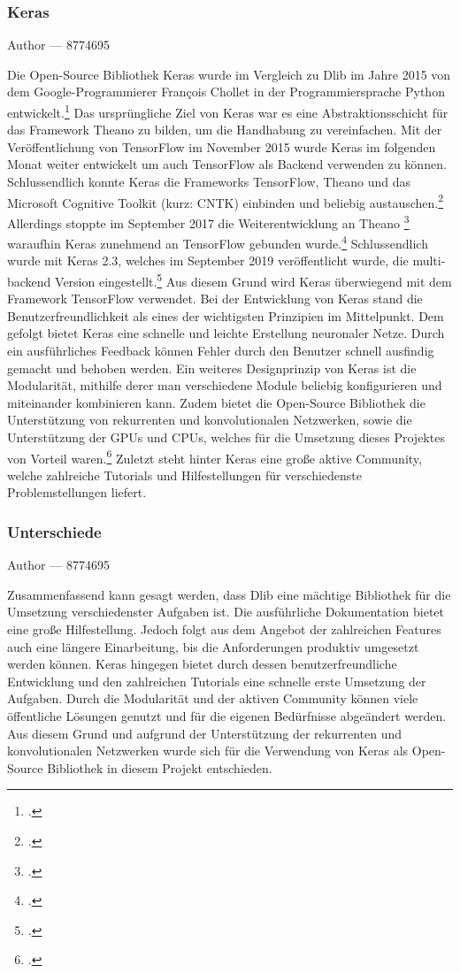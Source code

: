 \documentclass[12pt, a4paper]{report}
\makeatletter
\newcommand{\sectionauthor}[1]{%
  {\parindent0pt\vspace*{-5pt}%
  \large{Author --- }
  \linespread{1.1}\large\scshape#1%
  \par\nobreak\vspace*{35pt} }
  \@afterheading%
}
\makeatother
\begin{document}
\subsubsection{Keras}
\sectionauthor{8774695}
Die Open-Source Bibliothek Keras wurde im Vergleich zu Dlib im Jahre 2015 von dem Google-Programmierer François Chollet in der Programmiersprache Python entwickelt.\footcite[Vgl.]{Keras}
Das ursprüngliche Ziel von Keras war es eine Abstraktionsschicht für das Framework Theano zu bilden, um die Handhabung zu vereinfachen. Mit der Veröffentlichung von TensorFlow im November 2015 wurde Keras im folgenden Monat weiter entwickelt um auch TensorFlow als Backend verwenden zu können. Schlussendlich konnte Keras die Frameworks TensorFlow, Theano und das Microsoft Cognitive Toolkit (kurz: CNTK) einbinden und beliebig austauschen.\footcite[Vgl.]{Keras3} Allerdings stoppte im September 2017 die Weiterentwicklung an Theano
\footcite[Vgl.]{Theano}
 waraufhin Keras zunehmend an TensorFlow gebunden wurde.\footcite[Vgl.]{Keras4} Schlussendlich wurde mit Keras 2.3, welches im September 2019 veröffentlicht wurde, die multi-backend Version eingestellt.\footcite[Vgl.]{Keras5} Aus diesem Grund wird Keras überwiegend mit dem Framework TensorFlow verwendet.
\newline
Bei der Entwicklung von Keras stand die Benutzerfreundlichkeit als eines der wichtigsten Prinzipien im Mittelpunkt. Dem gefolgt bietet Keras eine schnelle und leichte Erstellung neuronaler Netze. Durch ein ausführliches Feedback können Fehler durch den Benutzer schnell ausfindig gemacht und behoben werden. Ein weiteres Designprinzip von Keras ist die Modularität, mithilfe derer man verschiedene Module beliebig konfigurieren und miteinander kombinieren kann. Zudem bietet die Open-Source Bibliothek die Unterstützung von rekurrenten und konvolutionalen Netzwerken, sowie die Unterstützung der GPUs und CPUs, welches für die Umsetzung dieses Projektes von Vorteil waren.\footcite[Vgl.]{Keras2}
Zuletzt steht hinter Keras eine große aktive Community, welche zahlreiche Tutorials und Hilfestellungen für verschiedenste Problemstellungen liefert.


\subsubsection{Unterschiede}
\sectionauthor{8774695}
Zusammenfassend kann gesagt werden, dass Dlib eine mächtige Bibliothek für die Umsetzung verschiedenster Aufgaben ist. Die ausführliche Dokumentation bietet eine große Hilfestellung. Jedoch folgt aus dem Angebot der zahlreichen Features auch eine längere Einarbeitung, bis die Anforderungen produktiv umgesetzt werden können.\newline
Keras hingegen bietet durch dessen benutzerfreundliche Entwicklung und den zahlreichen Tutorials eine schnelle erste Umsetzung der Aufgaben. Durch die Modularität und der aktiven Community können viele öffentliche Lösungen genutzt und für die eigenen Bedürfnisse abgeändert werden. 
Aus diesem Grund und aufgrund der Unterstützung der rekurrenten und konvolutionalen Netzwerken wurde sich für die Verwendung von Keras als Open-Source Bibliothek in diesem Projekt entschieden.
\end{document}
